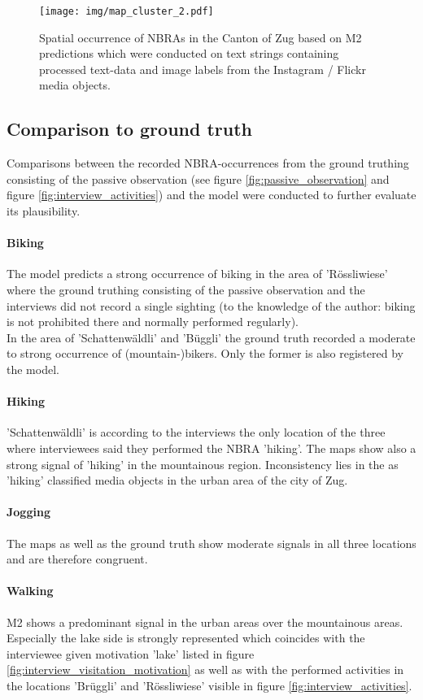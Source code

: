\begin{figure}[h!]
   \centering
   \texttt{[image: img/map\_cluster\_2.pdf]}
   \caption{Spatial occurrence of NBRAs in the Canton of Zug based on M2 predictions which were conducted on text strings containing processed text-data and image labels from the Instagram / Flickr media objects.}
   \label{fig:map_cluster_2}
\end{figure}

\subsection{Comparison to ground truth}
Comparisons between the recorded NBRA-occurrences from the ground truthing consisting of the passive observation (see figure \ref{fig:passive_observation} and figure \ref{fig:interview_activities}) and the model were conducted to further evaluate its plausibility. 

\paragraph*{Biking}
The model predicts a strong occurrence of biking in the area of 'R\"ossliwiese' where the ground truthing consisting of the passive observation and the interviews did not record a single sighting (to the knowledge of the author: biking is not prohibited there and normally performed regularly).\\
In the area of 'Schattenw\"aldli' and 'B\"uggli' the ground truth recorded a moderate to strong occurrence of (mountain-)bikers. Only the former is also registered by the model. 

\paragraph*{Hiking}
'Schattenw\"aldli' is according to the interviews the only location of the three where interviewees said they performed the NBRA 'hiking'. The maps show also a strong signal of 'hiking' in the mountainous region. Inconsistency lies in the as 'hiking' classified media objects in the urban area of the city of Zug.

\paragraph*{Jogging}
The maps as well as the ground truth show moderate signals in all three locations and are therefore congruent.

\paragraph*{Walking}
M2 shows a predominant signal in the urban areas over the mountainous areas. Especially the lake side is strongly represented which coincides with the interviewee given motivation 'lake' listed in figure \ref{fig:interview_visitation_motivation} as well as with the performed activities in the locations 'Br\"uggli' and 'R\"ossliwiese' visible in figure \ref{fig:interview_activities}.

